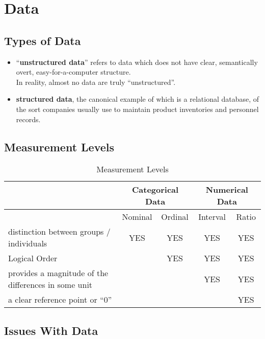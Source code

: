 \chapter{Data}

\section{Types of Data \cite{ir-1}}
\begin{itemize}
    \item “\textbf{unstructured data}” refers to data which does not have clear, semantically overt, easy-for-a-computer structure.\\
    In reality, almost no data are truly “unstructured”.

    \item \textbf{structured data}, the canonical example of which is a relational database, of the sort companies usually use to maintain product inventories and personnel records.
\end{itemize}


\section{Measurement Levels \cite{ism-1}}\label{measurement_levels}
\renewcommand{\arraystretch}{1.5}
\begin{table}[h!]
    \centering
    \begin{tabular}{|l|c|c|c|c|}
        \hline
        & \multicolumn{2}{c|}{Categorical Data} & \multicolumn{2}{c|}{Numerical Data} \\ \hline
        & Nominal & Ordinal & Interval & Ratio \\ \hline
        distinction between groups / individuals & YES & YES & YES & YES \\ \hline
        Logical Order & & YES & YES & YES \\ \hline
        provides a magnitude of the differences in some unit & & & YES & YES \\ \hline
        a clear reference point or ``0'' & & & & YES \\ \hline
    \end{tabular}
    \caption{Measurement Levels}
    \label{tab:data_comparison}
\end{table}

\section{Issues With Data}
